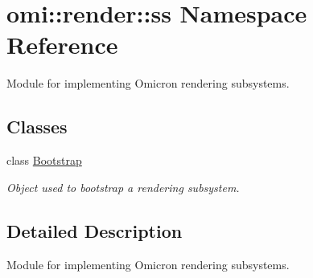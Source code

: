 \hypertarget{namespaceomi_1_1render_1_1ss}{}\section{omi\+:\+:render\+:\+:ss Namespace Reference}
\label{namespaceomi_1_1render_1_1ss}


Module for implementing Omicron rendering subsystems.  


\subsection*{Classes}
\begin{DoxyCompactItemize}
\item 
class \hyperlink{classomi_1_1render_1_1ss_1_1_bootstrap}{Bootstrap}
\begin{DoxyCompactList}\small\item\em Object used to bootstrap a rendering subsystem. \end{DoxyCompactList}\end{DoxyCompactItemize}


\subsection{Detailed Description}
Module for implementing Omicron rendering subsystems. 